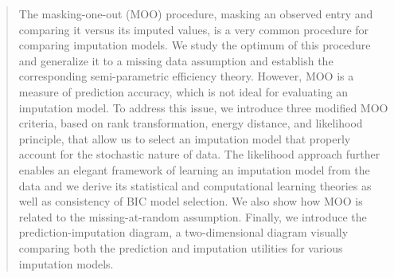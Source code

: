 \documentclass[aos, preprint]{imsart}
\theoremstyle{plain}
\theoremstyle{definition}
\begin{document}
\begin{frontmatter}
\begin{abstract}
The masking-one-out (MOO) procedure, masking an observed entry and 
comparing it versus its imputed values, is a very common procedure for comparing imputation models. 
We study the optimum of this procedure and generalize it to 
a missing data assumption and establish the corresponding semi-parametric efficiency theory. 
However, MOO is a measure of prediction accuracy, which is not ideal for evaluating an imputation model. To address this issue, 
we introduce three modified MOO criteria, based on rank transformation, energy distance, and likelihood principle, that allow us
to select an imputation model that properly account for the stochastic nature of data. 
The likelihood approach further enables  an elegant framework of learning an imputation model from the data
and we derive its statistical and computational learning theories as well as consistency of BIC model selection.
We also show how MOO is related to the missing-at-random assumption.
Finally, we introduce the prediction-imputation diagram, a two-dimensional diagram visually comparing
both the prediction and imputation utilities for various imputation models.
\end{abstract}

\begin{keyword}[class=MSC]
\end{keyword}

\begin{keyword}
\end{keyword}

\end{frontmatter}
\end{document}
